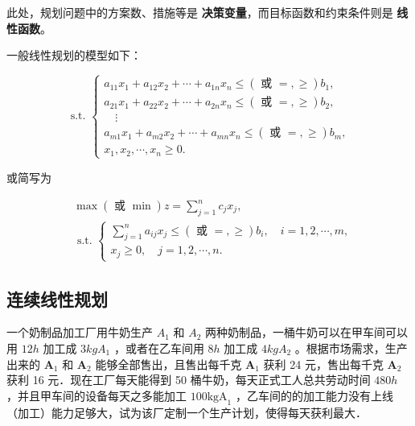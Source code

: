 此处，规划问题中的方案数、措施等是 \textbf{决策变量}，而目标函数和约束条件则是 \textbf{线性函数}。

\begin{theorem}
    一般线性规划的模型如下：

    $$
        \text { s.t. }\left\{\begin{array}{l}
            a_{11} x_1+a_{12} x_2+\cdots+a_{1 n} x_n \leqslant(\text { 或 }=, \geqslant) b_1,   \\
            a_{21} x_1+a_{22} x_2+\cdots+a_{2 n} x_n \leqslant(\text { 或 }=, \geqslant) b_2,   \\
            \quad \vdots                                                                       \\
            a_{m 1} x_1+a_{m 2} x_2+\cdots+a_{m n} x_n \leqslant(\text { 或 }=, \geqslant) b_m, \\
            x_1, x_2, \cdots, x_n \geqslant 0 .
        \end{array}\right.
    $$

    或简写为

    $$
        \begin{aligned}
             & \max (\text { 或 } \min ) z=\sum_{j=1}^n c_j x_j,                                                              \\
             & \text { s.t. }\left\{\begin{array}{l}
                                        \sum_{j=1}^n a_{i j} x_j \leqslant(\text { 或 }=, \geqslant) b_i, \quad i=1,2, \cdots, m, \\
                                        x_j \geqslant 0, \quad j=1,2, \cdots, n .
                                    \end{array}\right.
        \end{aligned}
    $$

\end{theorem}

\subsection{连续线性规划}

\begin{example}
    一个奶制品加工厂用牛奶生产 $A_1$ 和 $A_2$ 两种奶制品，一桶牛奶可以在甲车间可以用 $12 h$ 加工成 $3 k g A_1$ ，或者在乙车间用 $8 h$ 加工成 $4 k g A_2$ 。根据市场需求，生产出来的 $\boldsymbol{A}_1$ 和 $\boldsymbol{A}_2$ 能够全部售出，且售出每千克 $\boldsymbol{A}_1$ 获利 24 元，售出每千克 $\boldsymbol{A}_2$ 获利 16 元．现在工厂每天能得到 50 桶牛奶，每天正式工人总共劳动时间 $480 h$ ，并且甲车间的设备每天之多能加工 $100 \mathrm{kgA}_1$ ，乙车间的的加工能力没有上线（加工）能力足够大，试为该厂定制一个生产计划，使得每天获利最大．
\end{example}

